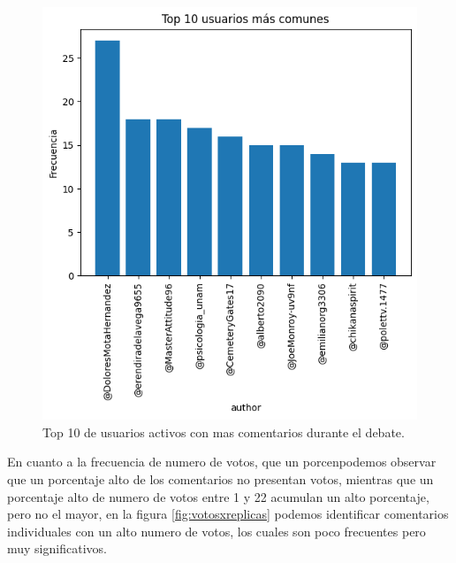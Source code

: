 \begin{figure}[h!]
	\centering
	\includegraphics[width=14cm]{../Datos/Top10Usuarios}
	\caption{Top 10 de usuarios activos con mas comentarios durante el debate.}
	\label{fig:top10}
\end{figure}

En cuanto a la frecuencia de numero de votos, que un porcenpodemos observar que un porcentaje alto de los comentarios no presentan votos, mientras que un porcentaje alto de numero de votos entre 1 y 22 acumulan un alto porcentaje, pero no el mayor, en la figura \ref{fig:votosxreplicas} podemos identificar comentarios individuales con un alto numero de votos, los cuales son poco frecuentes pero muy significativos.\\


